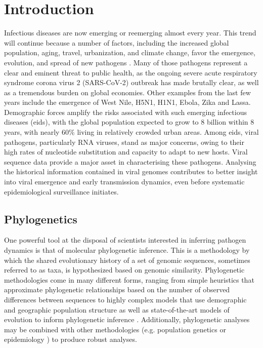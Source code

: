 \chapter{Introduction}\label{ch:introduction}


Infectious diseases are now emerging or reemerging almost every year.
This trend will continue because a number of factors, including the increased global population, aging, travel, urbanization, and climate change, favor the emergence, evolution, and spread of new pathogens \cite{bloom2017emerging}.
Many of those pathogens represent a clear and eminent threat to public health, as the ongoing severe acute respiratory syndrome corona virus 2 (SARS-CoV-2) outbreak has made brutally clear, as well as a tremendous burden on global economies.
Other examples from the last few years include the emergence of West Nile\cite{hadfield2019twenty}, H5N1\cite{imai2018diversity}, H1N1\cite{bedford2015global}, Ebola\cite{dudas2017virus}, Zika\cite{fauci2016zika, faria2016zika} and Lassa\cite{kafetzopoulou2019metagenomic}.
Demographic forces amplify the risks associated with such emerging infectious diseases (\gls{eids}), with the global population expected to grow to 8 billion within 8 years, with nearly 60\% living in relatively crowded urban areas.
Among \gls{eids}, viral pathogens, particularly RNA viruses, stand as major concerns, owing to their high rates of nucleotide substitution and capacity to adapt to new hosts.
Viral sequence data provide a major asset in characterising these pathogens.
Analysing the historical information contained in viral genomes contributes to better insight into viral emergence and early transmission dynamics, even before systematic epidemiological surveillance initiates.

\section{Phylogenetics}

One powerful tool at the disposal of scientists interested in inferring pathogen dynamics is that of molecular phylogenetic inference.
This is a methodology by which the shared evolutionary history of a set of genomic sequences, sometimes referred to as taxa, is hypothesized based on genomic similarity.
Phylogenetic methodologies come in many different forms, ranging from simple heuristics that approximate phylogenetic relationships based on the number of observed differences between sequences \cite{felsenstein2003inferring} to highly complex models that use demographic and geographic population structure as well as state-of-the-art models of evolution to inform phylogenetic inference \cite{dudas2018mers}.
Additionally, phylogenetic analyses may be combined with other methodologies (e.g. population genetics \cite{felsenstein2003inferring} or epidemiology \cite{black2020ten}) to produce robust analyses.

